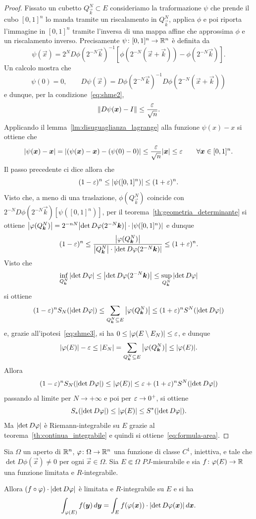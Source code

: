 \begin{proof}
Fissato un cubetto $Q^N_{\vec k}\subset E$ 
consideriamo la traformazione $\psi$ che prende 
il cubo $[0,1]^n$ lo manda tramite un riscalamento in $Q^N_{\vec k}$,
applica $\phi$ e poi riporta l'immagine in $[0,1]^n$
tramite l'inversa di una mappa affine che approssima $\phi$
e un riscalamento inverso.
Precisamente $\psi\colon[0,1]^n \to {\mathbb R}^n$ è definita da
\[
\psi(\vec x) 
  = 2^N D\phi(2^{-N}\vec k)^{-1}[\phi(2^{-N}(\vec x + \vec k)) - \phi(2^{-N}\vec k)].
\]
Un calcolo mostra che 
\[
\psi(0) = 0, \qquad
D\psi(\vec x) = D\phi(2^{-N}\vec k)^{-1} D\phi(2^{-N}(\vec x + \vec k))
\]
e dunque, per la condizione~\eqref{eq:shme2},
\[
{\left\Vert D\psi(\boldsymbol x) - I\right\Vert} \le \frac{\varepsilon}{\sqrt{n}}.
\]
Applicando il lemma~\ref{lm:disuguaglianza_lagrange} alla funzione $\psi(x)-x$ si ottiene che
\[
{\left|\psi(\boldsymbol x) - \boldsymbol x\right|} 
= {\left|(\psi(\boldsymbol x) - \boldsymbol x)-(\psi(0)-0)\right|}
\le \frac{\varepsilon}{\sqrt n} {\left|\boldsymbol x\right|}
\le \varepsilon \qquad \forall \boldsymbol x \in [0,1]^n.
\]
Il passo precedente ci dice allora che 
\[
   (1-\varepsilon)^n \le {\left|\psi([0,1]^n)\right|} \le (1+\varepsilon)^n.
\]
Visto che, a meno di una traslazione,
$\phi(Q^N_{\vec k})$ coincide con $2^{-N} D\phi(2^{-N}\vec k) [\psi([0,1]^n)]$,
per il teorema~\ref{th:geometria_determinante} si ottiene
${\left|\varphi(Q^N_{\boldsymbol k})\right|} = 2^{-nN} {\left|\det D\varphi(2^{-N}\boldsymbol k)\right|} \cdot {\left|\psi([0,1]^n)\right|}$
e dunque
\[
  (1-\varepsilon)^n 
  \le \frac{{\left|\varphi(Q^N_{\boldsymbol k})\right|}}{{\left|Q^N_{\boldsymbol k}\right|}\cdot {\left|\det D\varphi(2^{-N}\boldsymbol k)\right|}}
  \le (1+\varepsilon)^n.
\]
Visto che 
\[
  \inf_{Q^N_{\boldsymbol k}} {\left|\det D\varphi\right|} 
    \le {\left|\det D\varphi(2^{-N}\boldsymbol k)\right|} 
    \le \sup_{Q^N_{\boldsymbol k}} {\left|\det D\varphi\right|}
\]
si ottiene 
\[
  (1-\varepsilon)^n S_N({\left|\det D\varphi\right|})
  \le \sum_{Q^N_{\boldsymbol k}\subseteq E} {\left|\varphi(Q^N_{\boldsymbol k})\right|}
  \le (1+\varepsilon)^n S^N({\left|\det D\varphi\right|})
\]
e, grazie all'ipotesi~\eqref{eq:shme3}, si ha 
$0\le {\left|\varphi(E\setminus E_N)\right|} \le \varepsilon$,
e dunque
\[
  {\left|\varphi(E)\right|} - \varepsilon 
  \le {\left|E_N\right|} 
  = \sum_{Q^N_{\boldsymbol k}\subseteq E} {\left|\varphi(Q^N_{\boldsymbol k})\right|} 
  \le {\left|\varphi(E)\right|}.
\]
Allora
\[
(1-\varepsilon)^n S_N({\left|\det D\varphi\right|}) 
\le {\left|\varphi(E)\right|} 
\le \varepsilon + (1+\varepsilon)^n S^N({\left|\det D\varphi\right|})
\]
passando al limite per $N\to +\infty$ e poi per $\varepsilon\to 0^+$, 
si ottiene
\[
  S_*({\left|\det D\varphi\right|}) \le {\left|\varphi(E)\right|} \le S^*({\left|\det D\varphi\right|}).
\]
Ma ${\left|\det D\varphi\right|}$ è Riemann-integrabile su $E$ 
grazie al teorema~\ref{th:continua_integrabile} e quindi
si ottiene~\eqref{eq:formula-area}.
\end{proof}

\begin{theorem}
\label{th:cambio_variabile}
Sia $\Omega$ un aperto di ${\mathbb R}^n$, 
$\varphi\colon \Omega \to {\mathbb R}^n$ una funzione di classe $C^1$, iniettiva, 
e tale che $\det D \phi(\vec x)\neq 0$ per ogni $\vec x\in \Omega$.
Sia $E \Subset \Omega$  $PJ$-misurabile e sia $f\colon \varphi(E) \to {\mathbb R}$ una funzione limitata 
e $R$-integrabile.

Allora $(f\circ \varphi)\cdot {\left|\det D\varphi\right|}$ è limitata e $R$-integrabile su $E$ 
e si ha
\begin{equation}
  \label{eq:cambio-variabile}
  \int_{\varphi(E)} f (\boldsymbol y)\, d\boldsymbol y 
  = \int_E f(\varphi(\boldsymbol x)) \cdot {\left|\det D\varphi(\boldsymbol x)\right|}\, d\boldsymbol x.
\end{equation}
\end{theorem}

